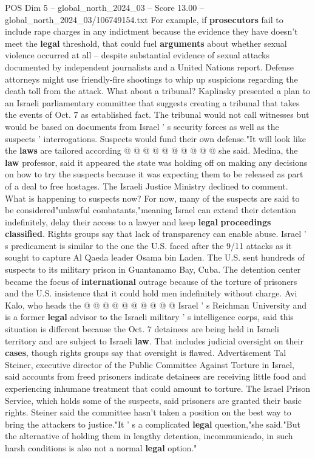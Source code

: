 \begin{textsample}{POS Dim 5 – global\_north\_2024\_03 – Score 13.00 – global\_north\_2024\_03/106749154.txt}
For example, if \textbf{prosecutors} fail to include rape charges in any indictment because the evidence they have doesn't meet the \textbf{legal} threshold, that could fuel \textbf{arguments} about whether sexual violence occurred at all -- despite substantial evidence of sexual attacks documented by independent journalists and a United Nations report.
Defense attorneys might use friendly-fire shootings to whip up suspicions regarding the death toll from the attack.
What about a tribunal?
Kaplinsky presented a plan to an Israeli parliamentary committee that suggests creating a tribunal that takes the events of Oct. 7 as established fact.
The tribunal would not call witnesses but would be based on documents from Israel ' s security forces as well as the suspects ' interrogations.
Suspects would fund their own defense."It will look like the \textbf{laws} are tailored according @ @ @ @ @ @ @ @ @ @ she said.
Medina, the \textbf{law} professor, said it appeared the state was holding off on making any decisions on how to try the suspects because it was expecting them to be released as part of a deal to free hostages.
The Israeli Justice Ministry declined to comment.
What is happening to suspects now?
For now, many of the suspects are said to be considered"unlawful combatants,"meaning Israel can extend their detention indefinitely, delay their access to a lawyer and keep \textbf{legal} \textbf{proceedings} \textbf{classified}.
Rights groups say that lack of transparency can enable abuse.
Israel ' s predicament is similar to the one the U.S. faced after the 9/11 attacks as it sought to capture Al Qaeda leader Osama bin Laden.
The U.S. sent hundreds of suspects to its military prison in Guantanamo Bay, Cuba.
The detention center became the focus of \textbf{international} outrage because of the torture of prisoners and the U.S. insistence that it could hold men indefinitely without charge.
Avi Kalo, who heads the @ @ @ @ @ @ @ @ @ @ Israel ' s Reichman University and is a former \textbf{legal} advisor to the Israeli military ' s intelligence corps, said this situation is different because the Oct. 7 detainees are being held in Israeli territory and are subject to Israeli \textbf{law}.
That includes judicial oversight on their \textbf{cases}, though rights groups say that oversight is flawed.
Advertisement Tal Steiner, executive director of the Public Committee Against Torture in Israel, said accounts from freed prisoners indicate detainees are receiving little food and experiencing inhumane treatment that could amount to torture.
The Israel Prison Service, which holds some of the suspects, said prisoners are granted their basic rights.
Steiner said the committee hasn't taken a position on the best way to bring the attackers to justice."It ' s a complicated \textbf{legal} question,"she said."But the alternative of holding them in lengthy detention, incommunicado, in such harsh conditions is also not a normal \textbf{legal} option."

\end{textsample}
